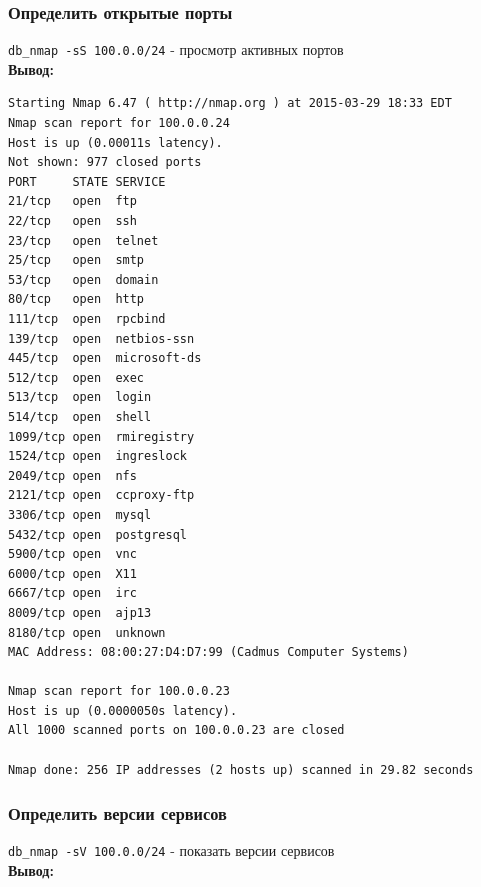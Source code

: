 \documentclass[12pt,a4paper]{article}
\begin{document}
\subsubsection{Определить открытые порты}

\verb+db_nmap -sS 100.0.0/24+ - просмотр активных портов\\

\textbf{Вывод:}

\begin{lstlisting}
Starting Nmap 6.47 ( http://nmap.org ) at 2015-03-29 18:33 EDT
Nmap scan report for 100.0.0.24
Host is up (0.00011s latency).
Not shown: 977 closed ports
PORT     STATE SERVICE
21/tcp   open  ftp
22/tcp   open  ssh
23/tcp   open  telnet
25/tcp   open  smtp
53/tcp   open  domain
80/tcp   open  http
111/tcp  open  rpcbind
139/tcp  open  netbios-ssn
445/tcp  open  microsoft-ds
512/tcp  open  exec
513/tcp  open  login
514/tcp  open  shell
1099/tcp open  rmiregistry
1524/tcp open  ingreslock
2049/tcp open  nfs
2121/tcp open  ccproxy-ftp
3306/tcp open  mysql
5432/tcp open  postgresql
5900/tcp open  vnc
6000/tcp open  X11
6667/tcp open  irc
8009/tcp open  ajp13
8180/tcp open  unknown
MAC Address: 08:00:27:D4:D7:99 (Cadmus Computer Systems)

Nmap scan report for 100.0.0.23
Host is up (0.0000050s latency).
All 1000 scanned ports on 100.0.0.23 are closed

Nmap done: 256 IP addresses (2 hosts up) scanned in 29.82 seconds
\end{lstlisting}
\newpage
\subsubsection{Определить версии сервисов}
\verb+db_nmap -sV 100.0.0/24+ - показать версии сервисов\\

\textbf{Вывод:}
\end{document}
